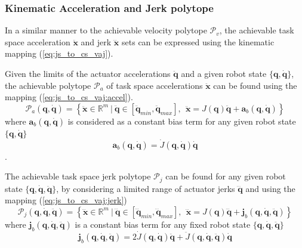 \subsubsection{Kinematic Acceleration and Jerk polytope}\label{ch:kin_accel_jerk}
In a similar manner to the achievable velocity polytope $\mathcal{P}_v$, the achievable task space acceleration $\ddot{\bm{x}}$ and jerk $\dddot{\bm{x}}$ sets can be expressed using the kinematic mapping (\ref{eq:js_to_cs_vaj}). 

Given the limits of the actuator accelerations $\ddot{\bm{q}}$ and a given robot state $\{\bm{q},\dot{\bm{q}}\}$, the achievable polytope $\mathcal{P}_a$ of task space accelerations $\ddot{\bm{x}}$ can be found using the mapping (\ref{eq:js_to_cs_vaj:accel}).
\begin{equation}
    \mathcal{P}_a(\bm{q}, \dot{\bm{q}}) = \left\{ \ddot{\bm{x}} \in \mathbb{R}^m ~|~ \ddot{\bm{q}}\in\left[\ddot{\bm{q}}_{min}, \ddot{\bm{q}}_{max} \right], ~~ \ddot{\bm{x}} = J(\bm{q})\ddot{\bm{q}} + \bm{a}_b(\bm{q}, \dot{\bm{q}})  \right\}
    \label{eq:poly_accel_kin}
\end{equation}
where $\bm{a}_b(\bm{q}, \dot{\bm{q}})$ is considered as a constant bias term for any given robot state $\{\bm{q},\dot{\bm{q}}\}$
\begin{equation}
    \bm{a}_b(\bm{q}, \dot{\bm{q}}) = \dot{J}(\bm{q},\dot{\bm{q}})\dot{\bm{q}}
\end{equation}.

The achievable task space jerk polytope $\mathcal{P}_j$ can be found for any given robot state $\{\bm{q},\dot{\bm{q}},\ddot{\bm{q}}\}$, by considering a limited range of actuator jerks $\dddot{\bm{q}}$ and using the mapping (\ref{eq:js_to_cs_vaj:jerk})
\begin{equation}
    \mathcal{P}_j(\bm{q}, \dot{\bm{q}}, \ddot{\bm{q}}) = \left\{ \dddot{\bm{x}} \in \mathbb{R}^m ~|~ \dddot{\bm{q}}\in\left[\dddot{\bm{q}}_{min}, \dddot{\bm{q}}_{max} \right], ~~ \dddot{\bm{x}} = J(\bm{q})\dddot{\bm{q}} + \bm{j}_b(\bm{q}, \dot{\bm{q}},\ddot{\bm{q}}) \right\}
    \label{eq:poly_jerk_kin}
\end{equation}
where $\bm{j}_b(\bm{q}, \dot{\bm{q}},\ddot{\bm{q}})$ is a constant bias term for any fixed robot state $\{\bm{q},\dot{\bm{q}},\ddot{\bm{q}}\}$
\begin{equation}
    \bm{j}_b(\bm{q}, \dot{\bm{q}},\ddot{\bm{q}}) =2\dot{J}(\bm{q},\dot{\bm{q}})\ddot{\bm{q}}+ \ddot{J}(\bm{q},\dot{\bm{q}},\ddot{\bm{q}})\dot{\bm{q}}
\end{equation}

